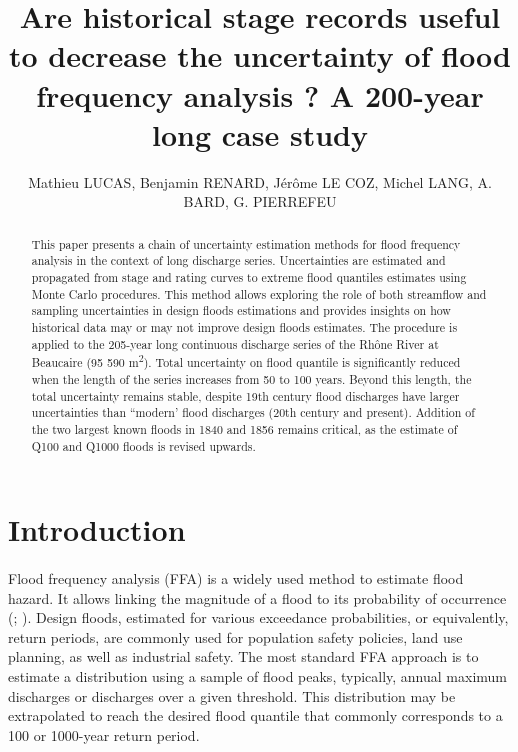 \documentclass[11pt]{article}
\title{Are historical stage records useful to decrease the uncertainty of flood frequency analysis ? A 200-year long case study}
\author{Mathieu LUCAS, Benjamin RENARD, Jérôme LE COZ, Michel LANG, A. BARD, G. PIERREFEU}
\begin{document}
\maketitle

\begin{abstract}

    This paper presents a chain of uncertainty estimation methods for flood frequency analysis in the context of long discharge series. Uncertainties are estimated and propagated from stage and rating curves to extreme flood quantiles estimates using Monte Carlo procedures. This method allows exploring the role of both streamflow and sampling uncertainties in design floods estimations and provides insights on how historical data may or may not improve design floods estimates. The procedure is applied to the 205-year long continuous discharge series of the Rhône River at Beaucaire (95 590 m\textsuperscript{2}). Total uncertainty on flood quantile is significantly reduced when the length of the series increases from 50 to 100 years. Beyond this length, the total uncertainty remains stable, despite 19th century flood discharges have larger uncertainties than “modern’ flood discharges (20th century and present). Addition of the two largest known floods in 1840 and 1856 remains critical, as the estimate of Q100 and Q1000 floods is revised upwards.
    
\end{abstract}

\section{Introduction}
    \paragraph{}
    Flood frequency analysis (FFA) is a widely used method to estimate flood hazard. It allows linking the magnitude of a flood to its probability of occurrence (\citet{hamed_flood_2019}; \citet{jain_design_2019}). Design floods, estimated for various exceedance probabilities, or equivalently, return periods, are commonly used for population safety policies, land use planning, as well as industrial safety. The most standard FFA approach is to estimate a distribution using a sample of flood peaks, typically, annual maximum discharges or discharges over a given threshold. This distribution may be extrapolated to reach the desired flood quantile that commonly corresponds to a 100 or 1000-year return period. 
    
\end{document}
